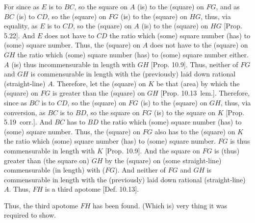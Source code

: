 \begin{Parallel}{}{}
{For since as $E$ is to $BC$, so the square on $A$ (is) to the (square)
on $FG$, and as $BC$ (is) to $CD$, so the (square) on $FG$
(is) to the (square) on $HG$, thus, via equality, as $E$ is to
$CD$, so the (square) on $A$ (is) to the (square) on $HG$ [Prop. 5.22]. And $E$ does not have to $CD$
the ratio which (some) square number (has) to (some) square number. Thus,
the (square) on $A$ does not have to the (square) on $GH$ the ratio
which (some) square number (has) to (some) square number either. 
$A$ (is) thus incommensurable in length with $GH$ [Prop. 10.9]. Thus, neither of $FG$ and $GH$
is commensurable in length with the (previously) laid down rational
(straight-line) $A$. Therefore, let the (square) on $K$ be that (area) by which the (square) on
$FG$ is greater than the (square) on $GH$ [Prop. 10.13~lem.]. Therefore, since as $BC$ is to
$CD$, so the (square) on $FG$ (is) to the (square) on $GH$, thus,
via conversion, as $BC$ is to $BD$, so the square on $FG$ (is) to the square on
$K$ [Prop. 5.19~corr.]. And $BC$ has to $BD$ the ratio which
(some) square number (has) to (some) square number. Thus, the (square)
on $FG$ also has to the (square) on $K$ the ratio which (some)
square number (has) to (some) square number.
$FG$ is thus commensurable in length with $K$ [Prop. 10.9]. And the square on $FG$ is (thus) greater
than (the square on) $GH$ by the (square) on (some straight-line)
commensurable (in length) with ($FG$). And neither of $FG$ and
$GH$ is commensurable in length with the (previously) laid down
rational (straight-line) $A$. Thus, $FH$ is a third
apotome [Def. 10.13].

Thus, the third apotome $FH$ has been found. (Which is) very thing
it was required to show.}
\end{Parallel}


\vspace{7pt}{\footnotesize\noindent$^\dag$ See footnote
to Prop.~10.50.}

